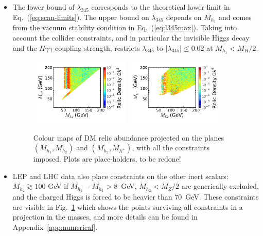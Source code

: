 \documentclass[12pt,a4paper]{article}
\newcommand {\red} {\color{red}}
\begin{document}
\begin{itemize}

\item The lower bound of $\lambda_{345}$ corresponds to the theoretical lower limit in Eq.~(\ref{eq:scan-limits}).
The upper bound on $\lambda_{345}$ depends on $M_{h_1}$ and comes from 
the vacuum stability condition in Eq.~(\ref{eq:l345max}). 
Taking into account the collider constraints, and in particular the invisible Higgs decay
and the $H\gamma\gamma$ coupling strength, restricts $\lambda_{345}$
to $|\lambda_{345}|\leq 0.02$ at $M_{h_1}<M_H/2$.

\begin{figure}[tbh]
\begin{center}
\includegraphics[width=0.45\textwidth]{Mh1_Mh2_Omega_small-cut12345678_z.pdf}
\includegraphics[width=0.45\textwidth]{Mhc_Mh2_Omega_small-cut12345678_z.pdf}
\caption{Colour maps of DM relic abundance projected on the planes $(M_{h_1}, M_{h_2})$ and $(M_{h_2}, M_{h^+})$, with all the constraints imposed. {\red Plots are place-holders, to be redone!}\label{fig:scan-masses}} 
\end{center}
\end{figure}



\item LEP and LHC data also place constraints on the other inert scalars: $M_{h_2}\gtrsim 100$ GeV if 
$M_{h_2}-M_{h_1}>8$~GeV, $M_{h_2} < M_Z/2$ are generically excluded, and 
the charged Higgs is forced to be heavier than $70$~GeV.
These constraints are visible in Fig.~\ref{fig:scan-masses} which shows the points surviving all constraints in a projection in the masses, and more details can be found in Appendix~\ref{app:numerical}.


\end{itemize}
\end{document}
